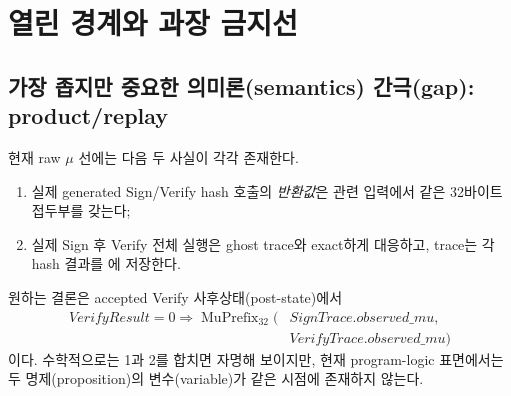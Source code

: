 \section{열린 경계와 과장 금지선}
\label{sec:boundaries}

\subsection{가장 좁지만 중요한 의미론(semantics) 간극(gap): product/replay}

현재 raw \(\mu\) 선에는 다음 두 사실이 각각 존재한다.

\begin{enumerate}
  \item 실제 generated Sign/Verify hash 호출의 \emph{반환값}은 관련 입력에서
        같은 32바이트 접두부를 갖는다;
  \item 실제 Sign 후 Verify 전체 실행은 ghost trace와 exact하게 대응하고,
        trace는 각 hash 결과를 에 저장한다.
\end{enumerate}

원하는 결론은 accepted Verify 사후상태(post-state)에서
\[
\begin{aligned}
  \mathit{VerifyResult}=0\Longrightarrow
  \operatorname{MuPrefix}_{32}(&
    \mathit{SignTrace.observed\_mu},\\[-0.3em]
    &\mathit{VerifyTrace.observed\_mu})
\end{aligned}
\]
이다. 수학적으로는 1과 2를 합치면 자명해 보이지만, 현재 program-logic
표면에서는 두 명제(proposition)의 변수(variable)가 같은 시점에 존재하지 않는다.

\begin{center}
\end{center}

